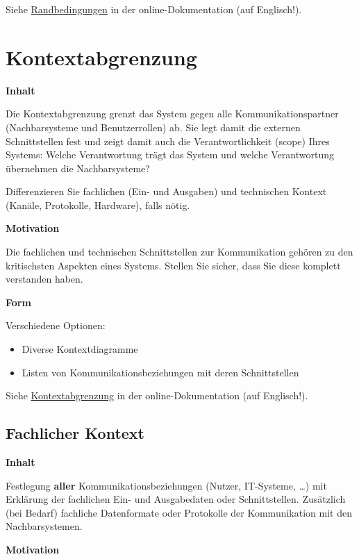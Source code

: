 \documentclass[
]{article}
\begin{document}
Siehe \href{https://docs.arc42.org/section-2/}{Randbedingungen} in der
online-Dokumentation (auf Englisch!).

\hypertarget{section-system-scope-and-context}{%
\section{Kontextabgrenzung}\label{section-system-scope-and-context}}

\textbf{Inhalt}

Die Kontextabgrenzung grenzt das System gegen alle Kommunikationspartner
(Nachbarsysteme und Benutzerrollen) ab. Sie legt damit die externen
Schnittstellen fest und zeigt damit auch die Verantwortlichkeit (scope)
Ihres Systems: Welche Verantwortung trägt das System und welche
Verantwortung übernehmen die Nachbarsysteme?

Differenzieren Sie fachlichen (Ein- und Ausgaben) und technischen
Kontext (Kanäle, Protokolle, Hardware), falls nötig.

\textbf{Motivation}

Die fachlichen und technischen Schnittstellen zur Kommunikation gehören
zu den kritischsten Aspekten eines Systems. Stellen Sie sicher, dass Sie
diese komplett verstanden haben.

\textbf{Form}

Verschiedene Optionen:

\begin{itemize}
\item
  Diverse Kontextdiagramme
\item
  Listen von Kommunikationsbeziehungen mit deren Schnittstellen
\end{itemize}

Siehe \href{https://docs.arc42.org/section-3/}{Kontextabgrenzung} in der
online-Dokumentation (auf Englisch!).

\hypertarget{_fachlicher_kontext}{%
\subsection{Fachlicher Kontext}\label{_fachlicher_kontext}}

\textbf{Inhalt}

Festlegung \textbf{aller} Kommunikationsbeziehungen (Nutzer, IT-Systeme,
\ldots) mit Erklärung der fachlichen Ein- und Ausgabedaten oder
Schnittstellen. Zusätzlich (bei Bedarf) fachliche Datenformate oder
Protokolle der Kommunikation mit den Nachbarsystemen.

\textbf{Motivation}
\end{document}
